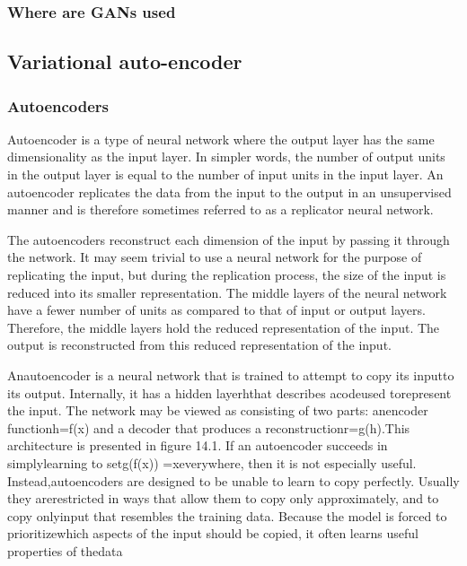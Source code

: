 \subsubsection{Where are GANs used}

\subsection{Variational auto-encoder}

\subsubsection{Autoencoders}

Autoencoder is a type of neural network where the output layer has the same dimensionality as the input layer. In simpler words, the number of output units in the output layer is equal to the number of input units in the input layer. An autoencoder replicates the data from the input to the output in an unsupervised manner and is therefore sometimes referred to as a replicator neural network.

The autoencoders reconstruct each dimension of the input by passing it through the network. It may seem trivial to use a neural network for the purpose of replicating the input, but during the replication process, the size of the input is reduced into its smaller representation. The middle layers of the neural network have a fewer number of units as compared to that of input or output layers. Therefore, the middle layers hold the reduced representation of the input. The output is reconstructed from this reduced representation of the input.

Anautoencoder is a neural network that is trained to attempt to copy its inputto its output. Internally, it has a hidden layerhthat describes acodeused torepresent the input. The network may be viewed as consisting of two parts: anencoder functionh=f(x) and a decoder that produces a reconstructionr=g(h).This architecture is presented in ﬁgure 14.1. If an autoencoder succeeds in simplylearning to setg(f(x)) =xeverywhere, then it is not especially useful. Instead,autoencoders are designed to be unable to learn to copy perfectly. Usually they arerestricted in ways that allow them to copy only approximately, and to copy onlyinput that resembles the training data. Because the model is forced to prioritizewhich aspects of the input should be copied, it often learns useful properties of thedata

